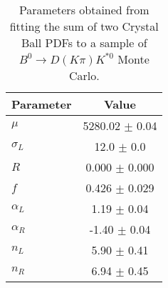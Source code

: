 \begin{table}[h]
  \centering
  \begin{tabular}{lc}
      \toprule
      Parameter & Value \\
      \midrule
      $\mu$ & 5280.02 $\pm$ 0.04 \\
      $\sigma_L$ & 12.0 $\pm$ 0.0 \\
      $R$ & 0.000 $\pm$ 0.000 \\
      $f$ & 0.426 $\pm$ 0.029 \\
      $\alpha_L$ & 1.19 $\pm$ 0.04 \\
      $\alpha_R$ & -1.40 $\pm$ 0.04 \\
      $n_L$ & 5.90 $\pm$ 0.41 \\
      $n_R$ & 6.94 $\pm$ 0.45 \\
  \bottomrule
  \end{tabular}
  \caption{Parameters obtained from fitting the sum of two Crystal Ball PDFs to a sample of $B^0 \to D(K\pi)K^{*0}$ Monte Carlo.}
\label{tab:signal_Kpi_MC_params}
\end{table}
